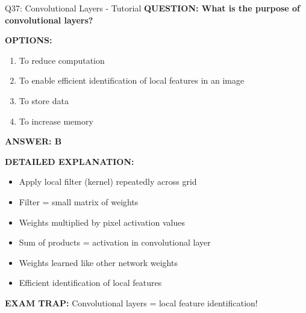 \documentclass[8pt]{beamer}
\begin{document}
	\begin{frame}{Q37: Convolutional Layers - Tutorial}
		\fontsize{6.5}{7.5}\selectfont
		\textbf{QUESTION: What is the purpose of convolutional layers?}
		
		\vspace{0.1cm}
		\textbf{OPTIONS:}
		\begin{enumerate}
			\item To reduce computation
			\item To enable efficient identification of local features in an image
			\item To store data
			\item To increase memory
		\end{enumerate}
		
		\vspace{0.1cm}
		\textcolor{myblue}{\textbf{ANSWER: B}}
		
		\vspace{0.1cm}
		\textbf{DETAILED EXPLANATION:}
		\begin{itemize}
			\item Apply local filter (kernel) repeatedly across grid
			\item Filter = small matrix of weights
			\item Weights multiplied by pixel activation values
			\item Sum of products = activation in convolutional layer
			\item Weights learned like other network weights
			\item Efficient identification of local features
		\end{itemize}
		
		\vspace{0.1cm}
		\textcolor{myred}{\textbf{EXAM TRAP:}} Convolutional layers = \textcolor{myblue}{local feature identification}!
	\end{frame}
	
\end{document}

